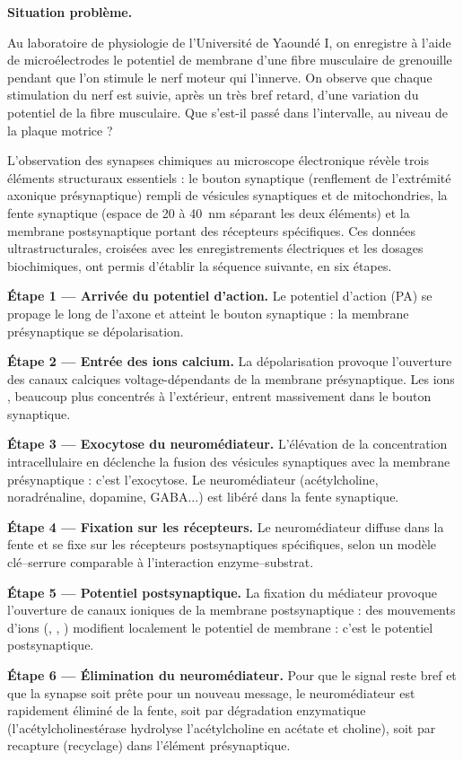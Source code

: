 \documentclass[11pt]{article}
\newcommand{\cle}[1]{{\popxbold\color{popdark}#1}}
\newcounter{popsec}
\newcounter{popsub}
\newcommand{\courssub}[1]{%
  \stepcounter{popsub}%
  \par\vspace{9pt}\noindent{\popxbold\fontsize{11.5}{13}\selectfont\color{popink}{\color{poporange}\thepopsec.\thepopsub}\hspace{6pt}#1}\par\nopagebreak\vspace{4pt}
}
\begin{document}
\courssub{III.1. Les étapes de la transmission chimique}

\textbf{Situation problème.}\par Au laboratoire de physiologie de l'Université de Yaoundé I, on enregistre à l'aide de microélectrodes le potentiel de membrane d'une fibre musculaire de grenouille pendant que l'on stimule le nerf moteur qui l'innerve. On observe que chaque stimulation du nerf est suivie, après un très bref retard, d'une variation du potentiel de la fibre musculaire. Que s'est-il passé dans l'intervalle, au niveau de la \cle{plaque motrice} ?

L'observation des synapses chimiques au microscope électronique révèle trois éléments structuraux essentiels : le \cle{bouton synaptique} (renflement de l'extrémité axonique présynaptique) rempli de \cle{vésicules synaptiques} et de mitochondries, la \cle{fente synaptique} (espace de 20 à \SI{40}{nm} séparant les deux éléments) et la \cle{membrane postsynaptique} portant des \cle{récepteurs} spécifiques. Ces données ultrastructurales, croisées avec les enregistrements électriques et les dosages biochimiques, ont permis d'établir la séquence suivante, en six étapes.

\begin{experience}
\textbf{Étape 1 — Arrivée du potentiel d'action.} Le potentiel d'action (PA) se propage le long de l'axone et atteint le bouton synaptique : la membrane présynaptique se \cle{dépolarisation}.

\textbf{Étape 2 — Entrée des ions calcium.} La dépolarisation provoque l'ouverture des \cle{canaux calciques voltage-dépendants} de la membrane présynaptique. Les ions , beaucoup plus concentrés à l'extérieur, entrent massivement dans le bouton synaptique.

\textbf{Étape 3 — Exocytose du neuromédiateur.} L'élévation de la concentration intracellulaire en  déclenche la fusion des vésicules synaptiques avec la membrane présynaptique : c'est l'\cle{exocytose}. Le \cle{neuromédiateur} (acétylcholine, noradrénaline, dopamine, GABA...) est libéré dans la fente synaptique.

\textbf{Étape 4 — Fixation sur les récepteurs.} Le neuromédiateur diffuse dans la fente et se fixe sur les \cle{récepteurs postsynaptiques spécifiques}, selon un modèle clé--serrure comparable à l'interaction enzyme--substrat.

\textbf{Étape 5 — Potentiel postsynaptique.} La fixation du médiateur provoque l'ouverture de \cle{canaux ioniques} de la membrane postsynaptique : des mouvements d'ions (, , ) modifient localement le potentiel de membrane : c'est le \cle{potentiel postsynaptique}.

\textbf{Étape 6 — Élimination du neuromédiateur.} Pour que le signal reste bref et que la synapse soit prête pour un nouveau message, le neuromédiateur est rapidement éliminé de la fente, soit par \cle{dégradation enzymatique} (l'\cle{acétylcholinestérase} hydrolyse l'acétylcholine en acétate et choline), soit par \cle{recapture} (recyclage) dans l'élément présynaptique.
\end{experience}
\end{document}
